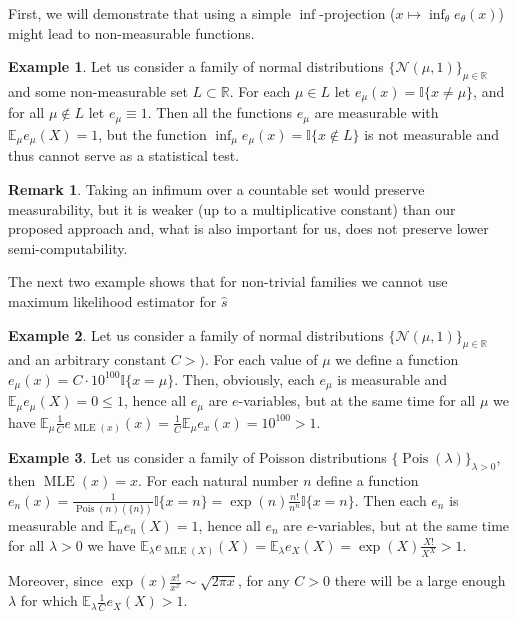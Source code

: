 \documentclass{article}
\theoremstyle{definition}
\newtheorem*{remark}{Remark}
\newtheorem{example}{Example}
\theoremstyle{definition}
\newcommand{\reals}{\mathbb{R}}
\newcommand{\expectE}{\mathbb{E}}
\newcommand{\Pois}{\operatorname{Pois}}
\begin{document}
First, we will demonstrate that using a simple $\inf$-projection ($x \mapsto \inf_{\theta}e_\theta(x)$) might lead to non-measurable functions. 

\begin{example}
    Let us consider a family of normal distributions $\{\mathcal{N}(\mu,1)\}_{\mu\in\reals}$ and some non-measurable set $L \subset \reals$. For each $\mu\in L$ let $e_\mu(x) = \mathbb{I}\{x\ne \mu\}$, and for all $\mu \notin L$ let $e_{\mu} \equiv 1$. Then all the functions $e_\mu$ are measurable with $\expectE_\mu e_\mu(X)=1$, but the function $\inf_\mu e_\mu(x) = \mathbb{I}\{x\notin L\}$ is not measurable and thus cannot serve as a statistical test.
\end{example}

\begin{remark}
    Taking an infimum over a countable set would preserve measurability, but it is weaker (up to a multiplicative constant) than our proposed approach and, what is also important for us, does not preserve lower semi-computability. 
\end{remark}

The next two example shows that for non-trivial families we cannot use maximum likelihood estimator for $\hat{s}$

\begin{example}
    Let us consider a family of normal distributions $\{\mathcal{N}(\mu,1)\}_{\mu\in\reals}$ and an arbitrary constant $C>)$. For each value of $\mu$ we define a function $e_\mu(x) = C\cdot10^{100} \mathbb{I}\{x=\mu\}$. Then, obviously, each $e_\mu$ is measurable and $\expectE_{\mu}e_{\mu}(X) =0\le1$, hence all $e_\mu$ are $e$-variables, but at the same time for all $\mu$ we have $\expectE_\mu \frac{1}{C}e_{\operatorname{MLE}(x)}(x)=\frac{1}{C}\expectE_\mu e_x(x) = 10^{100} > 1$.
\end{example}

\begin{example}
    Let us consider a family of Poisson distributions $\{\Pois(\lambda)\}_{\lambda>0}$, then $\operatorname{MLE}(x)=x$. For each natural number $n$ define a function $e_n(x) = \frac{1}{\Pois(n)(\{n\})} \mathbb{I}\{x=n\}=\exp(n)\frac{n!}{n^n}\mathbb{I}\{x=n\}$. Then each $e_n$ is measurable and $\expectE_{n}e_{n}(X) = 1$, hence all $e_n$ are $e$-variables, but at the same time for all $\lambda>0$ we have $\expectE_\lambda e_{\operatorname{MLE}(X)}(X)=\expectE_\lambda e_X(X) = \exp(X) \frac{X!}{X^X} > 1$.

    Moreover, since $\exp(x) \frac{x!}{x^x} \sim \sqrt{2\pi x}$, for any $C>0$ there will be a large enough $\lambda$ for which $\expectE_\lambda \frac{1}{C}e_X(X) > 1$.
\end{example}
\end{document}
